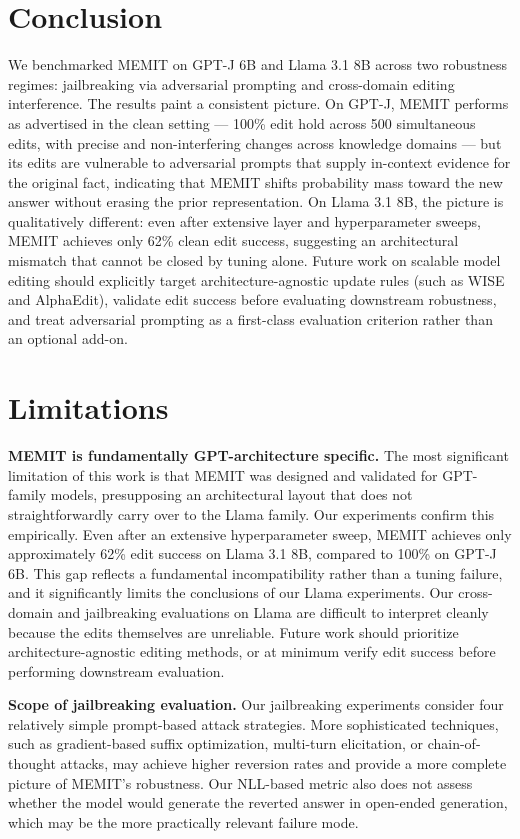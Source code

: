 \documentclass[11pt]{article}
\begin{document}
\section{Conclusion}
\label{sec:conclusion}
We benchmarked MEMIT on GPT-J 6B and Llama 3.1 8B across two robustness regimes: jailbreaking via adversarial prompting and cross-domain editing interference. The results paint a consistent picture. On GPT-J, MEMIT performs as advertised in the clean setting --- 100\% edit hold across 500 simultaneous edits, with precise and non-interfering changes across knowledge domains --- but its edits are vulnerable to adversarial prompts that supply in-context evidence for the original fact, indicating that MEMIT shifts probability mass toward the new answer without erasing the prior representation. On Llama 3.1 8B, the picture is qualitatively different: even after extensive layer and hyperparameter sweeps, MEMIT achieves only 62\% clean edit success, suggesting an architectural mismatch that cannot be closed by tuning alone. Future work on scalable model editing should explicitly target architecture-agnostic update rules (such as WISE and AlphaEdit), validate edit success before evaluating downstream robustness, and treat adversarial prompting as a first-class evaluation criterion rather than an optional add-on.

\section{Limitations}
\textbf{MEMIT is fundamentally GPT-architecture specific.} The most significant limitation of this work is that MEMIT was designed and validated for GPT-family models, presupposing an architectural layout that does not straightforwardly carry over to the Llama family. Our experiments confirm this empirically. Even after an extensive hyperparameter sweep, MEMIT achieves only approximately 62\% edit success on Llama 3.1 8B, compared to 100\% on GPT-J 6B. This gap reflects a fundamental incompatibility rather than a tuning failure, and it significantly limits the conclusions of our Llama experiments. Our cross-domain and jailbreaking evaluations on Llama are difficult to interpret cleanly because the edits themselves are unreliable. Future work should prioritize architecture-agnostic editing methods, or at minimum verify edit success before performing downstream evaluation.

\vspace{3.5mm}
\noindent \textbf{Scope of jailbreaking evaluation.} Our jailbreaking experiments consider four relatively simple prompt-based attack strategies. More sophisticated techniques, such as gradient-based suffix optimization, multi-turn elicitation, or chain-of-thought attacks, may achieve higher reversion rates and provide a more complete picture of MEMIT's robustness. Our NLL-based metric also does not assess whether the model would generate the reverted answer in open-ended generation, which may be the more practically relevant failure mode.
\end{document}
